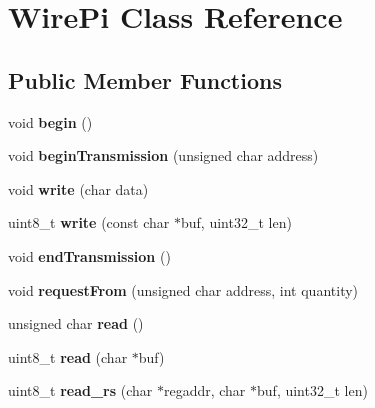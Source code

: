 \hypertarget{class_wire_pi}{}\section{Wire\+Pi Class Reference}
\label{class_wire_pi}
\subsection*{Public Member Functions}
\begin{DoxyCompactItemize}
\item 
\hypertarget{class_wire_pi_a561931953fccb4a93f5be06079a54e7b}{}void {\bfseries begin} ()\label{class_wire_pi_a561931953fccb4a93f5be06079a54e7b}

\item 
\hypertarget{class_wire_pi_a592d82d0e54ecc894ec5963f01487124}{}void {\bfseries begin\+Transmission} (unsigned char address)\label{class_wire_pi_a592d82d0e54ecc894ec5963f01487124}

\item 
\hypertarget{class_wire_pi_a218b0091d86e12e5876f820df5a8b683}{}void {\bfseries write} (char data)\label{class_wire_pi_a218b0091d86e12e5876f820df5a8b683}

\item 
\hypertarget{class_wire_pi_a32395dfd402421119d527d8725e025fe}{}uint8\+\_\+t {\bfseries write} (const char $\ast$buf, uint32\+\_\+t len)\label{class_wire_pi_a32395dfd402421119d527d8725e025fe}

\item 
\hypertarget{class_wire_pi_ae6d2f4b42fc5d893cda7559b8f53ca19}{}void {\bfseries end\+Transmission} ()\label{class_wire_pi_ae6d2f4b42fc5d893cda7559b8f53ca19}

\item 
\hypertarget{class_wire_pi_ac9a5b009f34a09ad2e3942256ccd4178}{}void {\bfseries request\+From} (unsigned char address, int quantity)\label{class_wire_pi_ac9a5b009f34a09ad2e3942256ccd4178}

\item 
\hypertarget{class_wire_pi_ad816efa9fa5b1ea4ef33deed21756aca}{}unsigned char {\bfseries read} ()\label{class_wire_pi_ad816efa9fa5b1ea4ef33deed21756aca}

\item 
\hypertarget{class_wire_pi_ab3054c93be2a26b613e0208b327e3eea}{}uint8\+\_\+t {\bfseries read} (char $\ast$buf)\label{class_wire_pi_ab3054c93be2a26b613e0208b327e3eea}

\item 
\hypertarget{class_wire_pi_aab78e3ff6ea6d5c65e8fabad6a2d2825}{}uint8\+\_\+t {\bfseries read\+\_\+rs} (char $\ast$regaddr, char $\ast$buf, uint32\+\_\+t len)\label{class_wire_pi_aab78e3ff6ea6d5c65e8fabad6a2d2825}

\end{DoxyCompactItemize}


